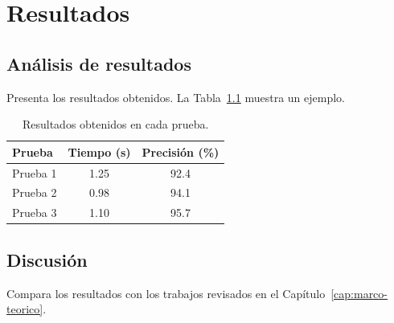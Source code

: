 \chapter{Resultados}
\label{cap:resultados}

\section{Análisis de resultados}
Presenta los resultados obtenidos. La Tabla~\ref{tab:resultados} muestra un ejemplo.

\begin{table}[htbp]
  \centering
  \caption{Resultados obtenidos en cada prueba.}
  \label{tab:resultados}
  \begin{tabular}{lcc}
    \toprule
    Prueba & Tiempo (s) & Precisión (\%) \\
    \midrule
    Prueba 1 & 1.25 & 92.4 \\
    Prueba 2 & 0.98 & 94.1 \\
    Prueba 3 & 1.10 & 95.7 \\
    \bottomrule
  \end{tabular}
\end{table}

\section{Discusión}
Compara los resultados con los trabajos revisados en el Capítulo~\ref{cap:marco-teorico}.
